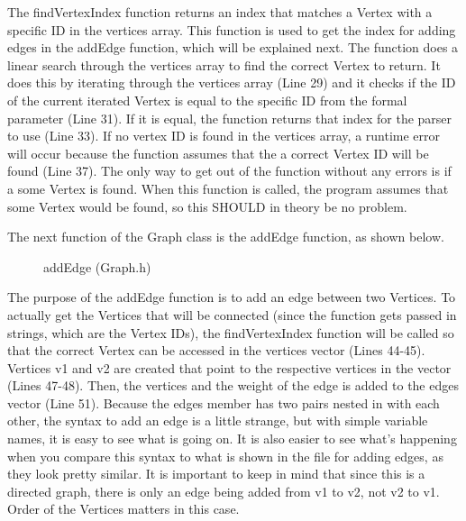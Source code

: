 \documentclass[letterpaper, 10pt]{article}
\begin{document}
\noindent
The findVertexIndex function returns an index that matches a Vertex with a specific ID in the vertices array. This function is used to get the index for adding edges in the addEdge function, which will be explained next. The function does a linear search through the vertices array to find the correct Vertex to return. It does this by iterating through the vertices array (Line 29) and it checks if the ID of the current iterated Vertex is equal to the specific ID from the formal parameter (Line 31). If it is equal, the function returns that index for the parser to use (Line 33). If no vertex ID is found in the vertices array, a runtime error will occur because the function assumes that the a correct Vertex ID will be found (Line 37). The only way to get out of the function without any errors is if a some Vertex is found. When this function is called, the program assumes that some Vertex would be found, so this SHOULD in theory be no problem.

\vspace{1em}
\noindent
The next function of the Graph class is the addEdge function, as shown below.

\begin{figure}[H]
  \centering
   
  \label{fig:figure2.8-part1}
\end{figure}

\begin{figure}[H]
  \centering
   
  \caption{addEdge (Graph.h)}
  \label{fig:figure2.8-part2}
\end{figure}

\noindent
The purpose of the addEdge function is to add an edge between two Vertices. To actually get the Vertices that will be connected (since the function gets passed in strings, which are the Vertex IDs), the findVertexIndex function will be called so that the correct Vertex can be accessed in the vertices vector (Lines 44-45). Vertices v1 and v2 are created that point to the respective vertices in the vector (Lines 47-48). Then, the vertices and the weight of the edge is added to the edges vector (Line 51). Because the edges member has two pairs nested in with each other, the syntax to add an edge is a little strange, but with simple variable names, it is easy to see what is going on. It is also easier to see what's happening when you compare this syntax to what is shown in the file for adding edges, as they look pretty similar. It is important to keep in mind that since this is a directed graph, there is only an edge being added from v1 to v2, not v2 to v1. Order of the Vertices matters in this case.
\end{document}

